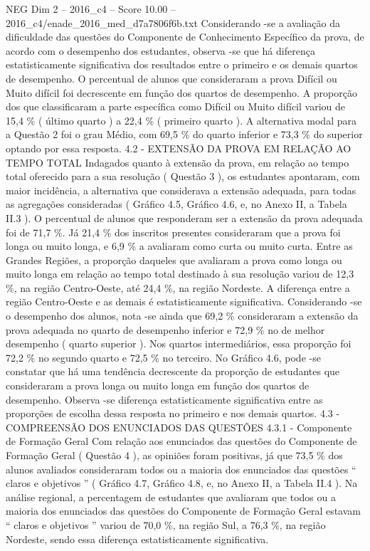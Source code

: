 \begin{textsample}{NEG Dim 2 – 2016\_c4 – Score 10.00 – 2016\_c4/enade\_2016\_med\_d7a7806f6b.txt}
Considerando -se a avaliação da dificuldade das questões do Componente de Conhecimento Específico da prova, de acordo com o desempenho dos estudantes, observa -se que há diferença estatisticamente significativa dos resultados entre o primeiro e os demais quartos de desempenho.
O percentual de alunos que consideraram a prova Difícil ou Muito difícil foi decrescente em função dos quartos de desempenho.
A proporção dos que classificaram a parte específica como Difícil ou Muito difícil variou de 15,4 \% ( último quarto ) a 22,4 \% ( primeiro quarto ).
A alternativa modal para a Questão 2 foi o grau Médio, com 69,5 \% do quarto inferior e 73,3 \% do superior optando por essa resposta. 4.2 - EXTENSÃO DA PROVA EM RELAÇÃO AO TEMPO TOTAL Indagados quanto à extensão da prova, em relação ao tempo total oferecido para a sua resolução ( Questão 3 ), os estudantes apontaram, com maior incidência, a alternativa que considerava a extensão adequada, para todas as agregações consideradas ( Gráfico 4.5, Gráfico 4.6, e, no Anexo II, a Tabela II.3 ).
O percentual de alunos que responderam ser a extensão da prova adequada foi de 71,7 \%.
Já 21,4 \% dos inscritos presentes consideraram que a prova foi longa ou muito longa, e 6,9 \% a avaliaram como curta ou muito curta.
Entre as Grandes Regiões, a proporção daqueles que avaliaram a prova como longa ou muito longa em relação ao tempo total destinado à sua resolução variou de 12,3 \%, na região Centro-Oeste, até 24,4 \%, na região Nordeste.
A diferença entre a região Centro-Oeste e as demais é estatisticamente significativa.
Considerando -se o desempenho dos alunos, nota -se ainda que 69,2 \% consideraram a extensão da prova adequada no quarto de desempenho inferior e 72,9 \% no de melhor desempenho ( quarto superior ).
Nos quartos intermediários, essa proporção foi 72,2 \% no segundo quarto e 72,5 \% no terceiro.
No Gráfico 4.6, pode -se constatar que há uma tendência decrescente da proporção de estudantes que consideraram a prova longa ou muito longa em função dos quartos de desempenho.
Observa -se diferença estatisticamente significativa entre as proporções de escolha dessa resposta no primeiro e nos demais quartos. 4.3 - COMPREENSÃO DOS ENUNCIADOS DAS QUESTÕES 4.3.1 - Componente de Formação Geral Com relação aos enunciados das questões do Componente de Formação Geral ( Questão 4 ), as opiniões foram positivas, já que 73,5 \% dos alunos avaliados consideraram todos ou a maioria dos enunciados das questões “ claros e objetivos ” ( Gráfico 4.7, Gráfico 4.8, e, no Anexo II, a Tabela II.4 ).
Na análise regional, a percentagem de estudantes que avaliaram que todos ou a maioria dos enunciados das questões do Componente de Formação Geral estavam “ claros e objetivos ” variou de 70,0 \%, na região Sul, a 76,3 \%, na região Nordeste, sendo essa diferença estatisticamente significativa.

\end{textsample}
